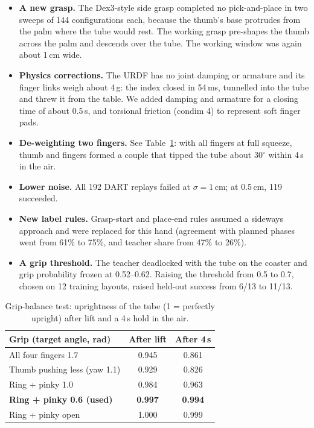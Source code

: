 \documentclass[10pt,twocolumn]{article}
\begin{document}
\begin{itemize}\setlength{\itemsep}{1pt}
\item \textbf{A new grasp.} The Dex3-style side grasp completed no pick-and-place in two sweeps of 144
configurations each, because the thumb's base protrudes from the palm where the tube would rest. The working grasp pre-shapes
the thumb across the palm and descends over the tube. The working window was again about 1\,cm wide.
\item \textbf{Physics corrections.} The URDF has no joint damping or armature and its finger links weigh about 4\,g: the
index closed in 54\,ms, tunnelled into the tube and threw it from the table. We added damping and armature for a closing
time of about 0.5\,s, and torsional friction (condim 4) to represent soft finger pads.
\item \textbf{De-weighting two fingers.} See Table~\ref{tab:hold}: with all fingers at full squeeze, thumb and fingers
formed a couple that tipped the tube about 30$^\circ$ within 4\,s in the air.
\item \textbf{Lower noise.} All 192 DART replays failed at $\sigma = 1$\,cm; at 0.5\,cm, 119 succeeded.
\item \textbf{New label rules.} Grasp-start and place-end rules assumed a sideways approach and were replaced for this
hand (agreement with planned phases went from 61\% to 75\%, and teacher share from 47\% to 26\%).
\item \textbf{A grip threshold.} The teacher deadlocked with the tube on the coaster and grip probability frozen at
0.52--0.62. Raising the threshold from 0.5 to 0.7, chosen on 12 training layouts, raised held-out success from 6/13 to 11/13.
\end{itemize}

\begin{table}[t]
\centering\small
\caption{Grip-balance test: uprightness of the tube (1 = perfectly upright) after lift and a 4\,s hold in the air.}
\label{tab:hold}
\begin{tabular}{@{}lcc@{}}
\toprule
Grip (target angle, rad) & After lift & After 4\,s\\
\midrule
All four fingers 1.7 & 0.945 & 0.861\\
Thumb pushing less (yaw 1.1) & 0.929 & 0.826\\
Ring + pinky 1.0 & 0.984 & 0.963\\
\textbf{Ring + pinky 0.6 (used)} & \textbf{0.997} & \textbf{0.994}\\
Ring + pinky open & 1.000 & 0.999\\
\bottomrule
\end{tabular}
\end{table}
\end{document}
